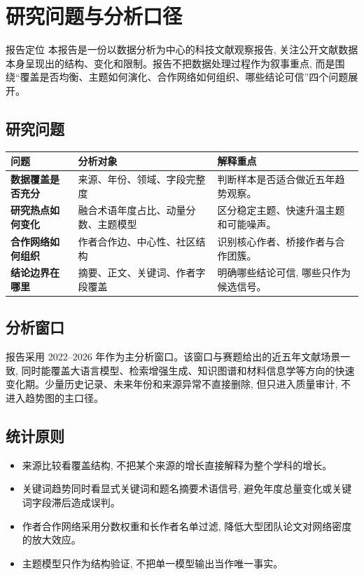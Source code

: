 \section{研究问题与分析口径}

\begin{reportbox}{报告定位}
本报告是一份以数据分析为中心的科技文献观察报告, 关注公开文献数据本身呈现出的结构、变化和限制。报告不把数据处理过程作为叙事重点, 而是围绕“覆盖是否均衡、主题如何演化、合作网络如何组织、哪些结论可信”四个问题展开。
\end{reportbox}

\subsection{研究问题}

\begin{tableblock}
\begin{tabularx}{\textwidth}{>{\bfseries}p{34mm}X X}
\toprule
问题 & 分析对象 & 解释重点 \\
\midrule
数据覆盖是否充分 & 来源、年份、领域、字段完整度 & 判断样本是否适合做近五年趋势观察。 \\
研究热点如何变化 & 融合术语年度占比、动量分数、主题模型 & 区分稳定主题、快速升温主题和可能噪声。 \\
合作网络如何组织 & 作者合作边、中心性、社区结构 & 识别核心作者、桥接作者与合作团簇。 \\
结论边界在哪里 & 摘要、正文、关键词、作者字段覆盖 & 明确哪些结论可信, 哪些只作为候选信号。 \\
\bottomrule
\end{tabularx}
\end{tableblock}

\subsection{分析窗口}

报告采用 2022--2026 年作为主分析窗口。该窗口与赛题给出的近五年文献场景一致, 同时能覆盖大语言模型、检索增强生成、知识图谱和材料信息学等方向的快速变化期。少量历史记录、未来年份和来源异常不直接删除, 但只进入质量审计, 不进入趋势图的主口径。

\subsection{统计原则}

\begin{itemize}
  \item 来源比较看覆盖结构, 不把某个来源的增长直接解释为整个学科的增长。
  \item 关键词趋势同时看显式关键词和题名摘要术语信号, 避免年度总量变化或关键词字段滞后造成误判。
  \item 作者合作网络采用分数权重和长作者名单过滤, 降低大型团队论文对网络密度的放大效应。
  \item 主题模型只作为结构验证, 不把单一模型输出当作唯一事实。
\end{itemize}

